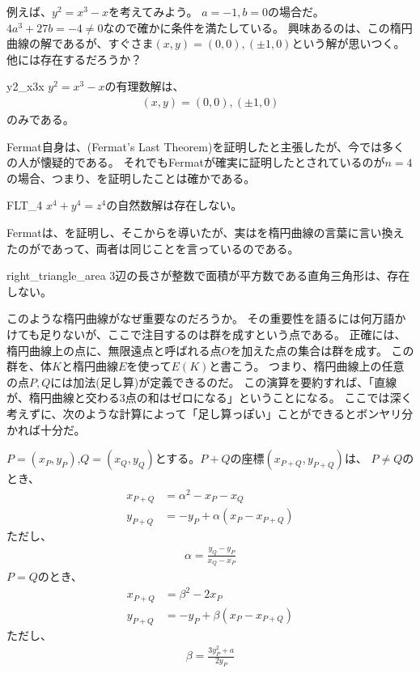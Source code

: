 例えば、$y^2=x^3-x$を考えてみよう。
$a=-1,b=0$の場合だ。
$4a^3+27b=-4\neq0$なので確かに条件を満たしている。
興味あるのは、この楕円曲線の解であるが、すぐさま$(x,y)=(0,0),(\pm1,0)$という解が思いつく。
他には存在するだろうか？

\begin{Prop}{}{y2_x3x}
$y^2=x^3-x$の有理数解は、
\begin{align*}
(x,y) = (0,0), (\pm1, 0)
\end{align*}
のみである。
\end{Prop}

Fermat自身は、(Fermat's Last Theorem)を証明したと主張したが、今では多くの人が懐疑的である。
それでもFermatが確実に証明したとされているのが$n=4$の場合、つまり、を証明したことは確かである。

\begin{Prop}{}{FLT_4}
$x^4+y^4=z^4$の自然数解は存在しない。
\end{Prop}

Fermatは、を証明し、そこからを導いたが、実はを楕円曲線の言葉に言い換えたのがであって、両者は同じことを言っているのである。

\begin{Prop}{}{right_triangle_area}
3辺の長さが整数で面積が平方数である直角三角形は、存在しない。
\end{Prop}

このような楕円曲線がなぜ重要なのだろうか。
その重要性を語るには何万語かけても足りないが、ここで注目するのは群を成すという点である。
正確には、楕円曲線上の点に、無限遠点と呼ばれる点$O$を加えた点の集合は群を成す。
この群を、体$K$と楕円曲線$E$を使って$E(K)$と書こう。
つまり、楕円曲線上の任意の点$P,Q$には加法(足し算)が定義できるのだ。
この演算を要約すれば、「直線が、楕円曲線と交わる3点の和はゼロになる」ということになる。
ここでは深く考えずに、次のような計算によって「足し算っぽい」ことができるとボンヤリ分かれば十分だ。

$P=(x_P,y_P)$,$Q=(x_Q,y_Q)$とする。$P+Q$の座標$(x_{P+Q},y_{P+Q})$は、
$P\neq Q$のとき、
\begin{align*}
x_{P+Q} &= \alpha^2 - x_P - x_Q\\
y_{P+Q} &= -y_P + \alpha(x_P - x_{P+Q})
\end{align*}
ただし、
\begin{align*}
\alpha = \frac{y_Q - y_P}{x_Q - x_P}
\end{align*}
$P=Q$のとき、
\begin{align*}
x_{P+Q} &= \beta^2 - 2x_P\\
y_{P+Q} &= -y_P + \beta(x_P - x_{P+Q})
\end{align*}
ただし、
\begin{align*}
\beta = \frac{3y_P^2 + a}{2y_P}
\end{align*}

